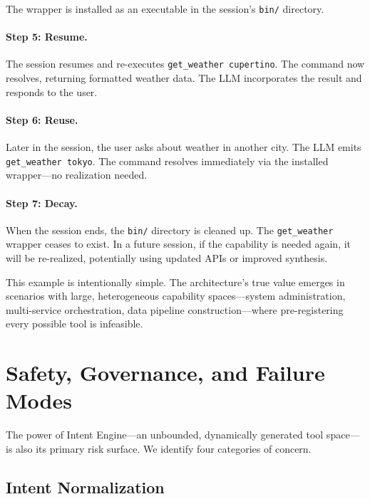 \documentclass[11pt]{article}
\begin{document}
The wrapper is installed as an executable in the session's \texttt{bin/} directory.

\paragraph{Step 5: Resume.}
The session resumes and re-executes \texttt{get\_weather cupertino}. The command now resolves, returning formatted weather data. The LLM incorporates the result and responds to the user.

\paragraph{Step 6: Reuse.}
Later in the session, the user asks about weather in another city. The LLM emits \texttt{get\_weather tokyo}. The command resolves immediately via the installed wrapper---no realization needed.

\paragraph{Step 7: Decay.}
When the session ends, the \texttt{bin/} directory is cleaned up. The \texttt{get\_weather} wrapper ceases to exist. In a future session, if the capability is needed again, it will be re-realized, potentially using updated APIs or improved synthesis.

\medskip

This example is intentionally simple. The architecture's true value emerges in scenarios with large, heterogeneous capability spaces---system administration, multi-service orchestration, data pipeline construction---where pre-registering every possible tool is infeasible.

\section{Safety, Governance, and Failure Modes}
\label{sec:safety}

The power of Intent Engine---an unbounded, dynamically generated tool space---is also its primary risk surface.
We identify four categories of concern.

\subsection{Intent Normalization}
\end{document}
